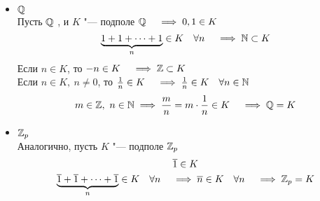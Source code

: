 \begin{eproof}
	\item
	\begin{itemize}
		\item $ \mathbb{Q} $ \\
		Пусть $ \mathbb{Q} $ , и $ K $ "--- подполе $ \mathbb{Q} \quad \implies 0, 1 \in K $
		$$ \underbrace{1 + 1 + \dots + 1}_n \in K \quad \forall n \quad \implies \mathbb{N} \subset K $$
		Если $ n \in K $, то $ -n \in K \quad \implies \mathbb{Z} \subset K $ \\
		Если $ n \in K, ~ n \ne 0 $, то $ \frac1n \in K \quad \implies \frac1n \in K \quad \forall n \in \mathbb{N} $
		$$ m \in \mathbb{Z}, ~ n \in \mathbb{N} \implies \frac mn = m \cdot \frac1n \in K \quad \implies \mathbb{Q} = K $$
		\item $ \mathbb{Z}_p $ \\
		Аналогично, пусть $ K $ "--- подполе $ \mathbb{Z}_p $
		$$ \overline1 \in K $$
		$$ \underbrace{\overline1 + \overline1 + \dots + \overline1}_n \in K \quad \forall n \quad \implies \overline n \in K \quad \forall n \quad \implies \mathbb{Z}_p = K $$
	\end{itemize}


\end{eproof}
